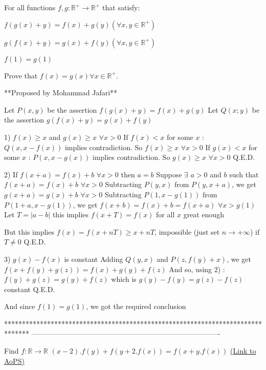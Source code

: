 \begin{solution}
	\begin{tcolorbox}For all functions $f,g:\mathbb{R}^{+} \to \mathbb{R}^{+}$ that satisfy:

$f(g(x)+y)=f(x)+g(y) (\forall x,y \in \mathbb{R}^{+})$

$g(f(x)+y)=g(x)+f(y) (\forall x,y \in \mathbb{R}^{+})$

$f(1)=g(1)$  

Prove that $f(x)=g(x) \forall x \in \mathbb{R}^{+}$.

**Proposed by Mohammad Jafari**\end{tcolorbox}
Let $P(x,y)$ be the assertion $f(g(x)+y)=f(x)+g(y)$
Let $Q(x;y)$ be the assertion $g(f(x)+y)=g(x)+f(y)$

1) $f(x)\ge x$ and $g(x)\ge x$ $\forall x>0$
If $f(x)<x$ for some $x$ : $Q(x,x-f(x))$ implies contradiction. 
So $f(x)\ge x$ $\forall x>0$
If $g(x)<x$ for some $x$ : $P(x,x-g(x))$ implies contradiction. 
So $g(x)\ge x$ $\forall x>0$
Q.E.D.

2) If $f(x+a)=f(x)+b$ $\forall x>0$ then $a=b$
Suppose $\exists$ $a>0$ and $b$ such that $f(x+a)=f(x)+b$ $\forall x>0$
Subtracting $P(y,x)$ from $P(y,x+a)$, we get $g(x+a)=g(x)+b$ $\forall x>0$
Subtracting $P(1,x-g(1))$ from $P(1+a,x-g(1))$, we get $f(x+b)=f(x)+b=f(x+a)$ $\forall x>g(1)$
Let $T=|a-b|$ this implies $f(x+T)=f(x)$ for all $x$ great enough

But this implies $f(x)=f(x+nT)\ge x+nT$, impossible (just set $n\to +\infty$) if $T\ne 0$
Q.E.D.

3) $g(x)-f(x)$ is constant
Adding $Q(y,x)$ and $P(z,f(y)+x)$, we get $f(x+f(y)+g(z))=f(x)+g(y)+f(z)$
And so, using 2) : $f(y)+g(z)=g(y)+f(z)$ which is $g(y)-f(y)=g(z)-f(z)$ constant
Q.E.D.

And since $f(1)=g(1)$, we got the required conclusion



\end{solution}
*******************************************************************************
-------------------------------------------------------------------------------

\begin{problem}
	 Find $f:\mathbb{R}\to \mathbb{R}$
 $(x-2).f(y)+f(y+2.f(x))=f(x+y.f(x))$
	\flushright \href{https://artofproblemsolving.com/community/c6h1612717}{(Link to AoPS)}
\end{problem}



